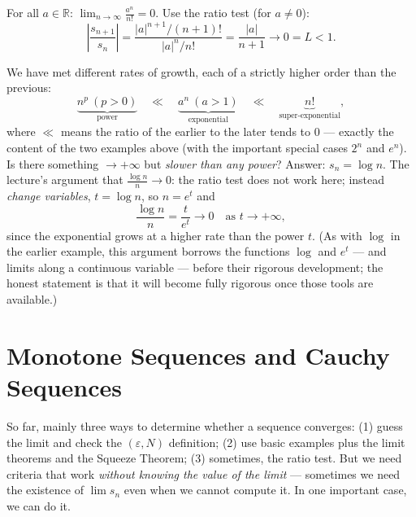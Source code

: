 \documentclass[11pt]{report}
\begin{document}
\begin{exbox}
For all $a \in \mathbb{R}$: $\displaystyle\lim_{n\to\infty} \frac{a^n}{n!} = 0$. Use the ratio test (for $a \neq 0$):
\[
\left| \frac{s_{n+1}}{s_n} \right| = \frac{|a|^{n+1}/(n+1)!}{|a|^n/n!} = \frac{|a|}{n+1} \longrightarrow 0 = L < 1. \tag*{$\blacksquare$}
\]
\end{exbox}

\begin{rembox}
We have met different rates of growth, each of a strictly higher order than the previous:
\[
\underbrace{n^p \ (p > 0)}_{\text{power}} \quad \ll \quad \underbrace{a^n \ (a > 1)}_{\text{exponential}} \quad \ll \quad \underbrace{n!}_{\text{super-exponential}},
\]
where $\ll$ means the ratio of the earlier to the later tends to $0$ --- exactly the content of the two examples above (with the important special cases $2^n$ and $e^n$). Is there something $\to +\infty$ but \emph{slower than any power}? Answer: $s_n = \log n$. The lecture's argument that $\tfrac{\log n}{n} \to 0$: the ratio test does not work here; instead \emph{change variables}, $t = \log n$, so $n = e^t$ and
\[
\frac{\log n}{n} = \frac{t}{e^t} \longrightarrow 0 \quad \text{as } t \to +\infty,
\]
since the exponential grows at a higher rate than the power $t$. (As with $\log$ in the earlier example, this argument borrows the functions $\log$ and $e^t$ --- and limits along a continuous variable --- before their rigorous development; the honest statement is that it will become fully rigorous once those tools are available.)
\end{rembox}


\section{Monotone Sequences and Cauchy Sequences}

So far, mainly three ways to determine whether a sequence converges: (1) guess the limit and check the $(\varepsilon, N)$ definition; (2) use basic examples plus the limit theorems and the Squeeze Theorem; (3) sometimes, the ratio test. But we need criteria that work \emph{without knowing the value of the limit} --- sometimes we need the existence of $\lim s_n$ even when we cannot compute it. In one important case, we can do it.
\end{document}
